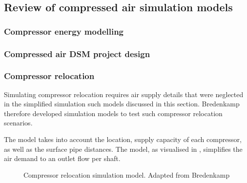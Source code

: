 \subsection{Review of compressed air simulation models} \label{simplfiedModels}
\subsubsection{Compressor energy modelling}
\subsubsection{Compressed air DSM project design}
\subsubsection{Compressor relocation}
Simulating compressor relocation requires air supply details that were neglected in the simplified simulation such models discussed in this section. Bredenkamp \cite{Bredenkamp2013Masters} therefore developed simulation models to test such compressor relocation scenarios. 
\par
The model takes into account the location, supply capacity of each compressor, as well as the surface pipe distances. The model, as visualised in , simplifies the air demand to an outlet flow per shaft.
\par
\begin{figure}[h!]
	\centering
	\caption[Compressor relocation simulation model]{Compressor relocation simulation model. Adapted from Bredenkamp \cite{Bredenkamp2013Masters}}
	\label{fig: bredenkamp model}
\end{figure} 
